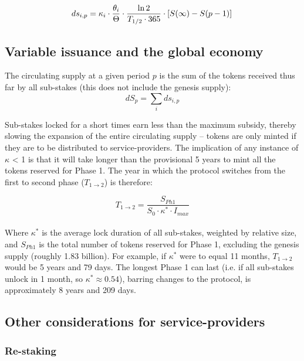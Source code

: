 \documentclass[longbibliography,nofootinbib]{revtex4-1}
\begin{document}
\begin{equation}
    \label{eq:rate-max}
    ds_{i,p} = \kappa_i \cdot \frac{\theta_i}{\Theta} \cdot \frac{\ln{2}}{T_{1/2} \cdot 365 } \cdot \left[S(\infty) - S(p-1) \right]\\
\end{equation}

\subsection{Variable issuance and the global economy}

The circulating supply at a given period $p$ is the sum of the tokens received thus far by all sub-stakes (this does not include the genesis supply):
\begin{equation}
    dS_p= \sum_i ds_{i,p}
\end{equation}

Sub-stakes locked for a short times earn less than the maximum subsidy, thereby slowing the expansion of the entire circulating supply – tokens are only minted if they are to be distributed to service-providers. The implication of any instance of $\kappa$ < 1 is that it will take longer than the provisional 5 years to mint all the tokens reserved for Phase 1. The year in which the protocol switches from the first to second phase ($T_{1\rightarrow2}$) is therefore: 

\begin{equation}
\label{phaseswitch}
    T_{1\rightarrow2}= \frac{S_{Ph1}}{S_0 \cdot \kappa^* \cdot I_{max}}
\end{equation}
\\
Where $\kappa^*$ is the average lock duration of all sub-stakes, weighted by relative size, and $S_{Ph1}$ is the total number of tokens reserved for Phase 1, excluding the genesis supply (roughly 1.83 billion). For example, if $\kappa^*$ were to equal 11 months, $T_{1\rightarrow2}$ would be 5 years and 79 days. The longest Phase 1 can last (i.e. if all sub-stakes unlock in 1 month, so $\kappa^* \approx 0.54$), barring changes to the protocol, is approximately 8 years and 209 days.

\subsection{Other considerations for service-providers}

\subsubsection{Re-staking}
\end{document}
